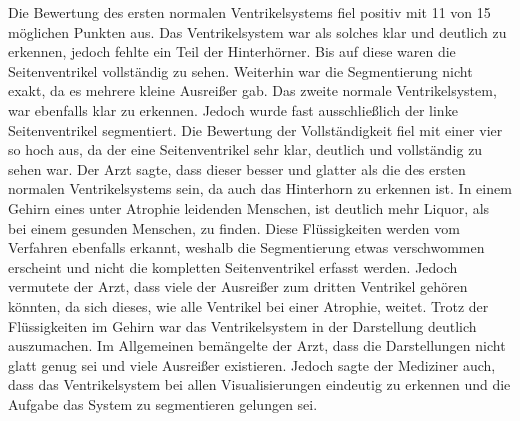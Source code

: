 Die Bewertung des ersten normalen Ventrikelsystems fiel positiv mit 11 von 15 möglichen Punkten aus. Das Ventrikelsystem war als solches klar und deutlich zu erkennen, jedoch fehlte ein Teil der Hinterhörner. Bis auf diese waren die Seitenventrikel vollständig zu sehen. Weiterhin war die Segmentierung nicht exakt, da es mehrere kleine Ausreißer gab.
\newline
Das zweite normale Ventrikelsystem, war ebenfalls klar zu erkennen. Jedoch wurde fast ausschließlich der linke Seitenventrikel segmentiert. Die Bewertung der Vollständigkeit fiel mit einer vier so hoch aus, da der eine Seitenventrikel sehr klar, deutlich und vollständig zu sehen war. Der Arzt sagte, dass dieser besser und glatter als die des ersten normalen Ventrikelsystems sein, da auch das Hinterhorn zu erkennen ist. 
\newline
In einem Gehirn eines unter Atrophie leidenden Menschen, ist deutlich mehr Liquor, als bei einem gesunden Menschen, zu finden. Diese Flüssigkeiten werden vom Verfahren ebenfalls erkannt, weshalb die Segmentierung etwas verschwommen erscheint und nicht die kompletten Seitenventrikel erfasst werden. Jedoch vermutete der Arzt, dass viele der Ausreißer zum dritten Ventrikel gehören könnten, da sich dieses, wie alle Ventrikel bei einer Atrophie, weitet. Trotz der Flüssigkeiten im Gehirn war das Ventrikelsystem in der Darstellung deutlich auszumachen.
\newline
Im Allgemeinen bemängelte der Arzt, dass die Darstellungen nicht glatt genug sei und viele Ausreißer existieren. Jedoch sagte der Mediziner auch, dass das Ventrikelsystem bei allen Visualisierungen eindeutig zu erkennen und die Aufgabe das System zu segmentieren gelungen sei.


